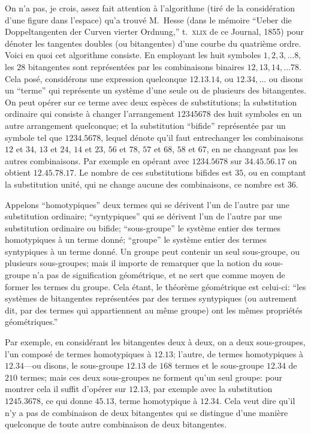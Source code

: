 \documentclass[11pt,a4paper]{article}
\begin{document}
On n'a pas, je crois, assez fait attention \`a l'algorithme (tir\'e de la consid\'eration
d'une figure dans l'espace) qu'a trouv\'e M.\ Hesse (dans le m\'emoire ``Ueber die
Doppeltangenten der Curven vierter Ordnung,'' t.\ \textsc{xlix} de ce Journal, 1855) pour
d\'enoter les tangentes doubles (ou bitangentes) d'une courbe du quatri\`eme ordre.
Voici en quoi cet algorithme consiste. En employant les huit symboles $1, 2, 3, \ldots 8$,
les $28$ bitangentes sont repr\'esent\'ees par les combinaisons binaires $12, 13, 14, \ldots 78$.
Cela pos\'e, consid\'erons une expression quelconque $12.13.14$, ou $12.34, \ldots$ ou
disons un ``terme'' qui repr\'esente un syst\`eme d'une seule ou de plusieurs des
bitangentes. On peut op\'erer sur ce terme avec deux esp\`eces de substitutions; la
substitution ordinaire qui consiste \`a changer l'arrangement $12345678$ des huit
symboles en un autre arrangement quelconque; et la substitution ``bifide''
repr\'esent\'ee par un symbole tel que $1234.5678$, lequel d\'enote qu'il faut
entrechanger les combinaisons $12$ et $34$, $13$ et $24$, $14$ et $23$, $56$ et $78$,
$57$ et $68$, $58$ et $67$, en ne changeant pas les autres combinaisons. Par exemple en
op\'erant avec $1234.5678$ sur $34.45.56.17$ on obtient $12.45.78.17$. Le nombre de
ces substitutions bifides est $35$, ou en comptant la substitution unit\'e, qui ne
change aucune des combinaisons, ce nombre est $36$.

Appelons ``homotypiques'' deux termes qui se d\'erivent l'un de l'autre par une
substitution ordinaire; ``syntypiques'' qui se d\'erivent l'un de l'autre par une
substitution ordinaire ou bifide; ``sous-groupe'' le syst\`eme entier des termes
homotypiques \`a un terme donn\'e; ``groupe'' le syst\`eme entier des termes syntypiques
\`a un terme donn\'e. Un groupe peut contenir un seul sous-groupe, ou plusieurs
sous-groupes; mais il importe de remarquer que la notion du sous-groupe n'a pas de
signification g\'eom\'etrique, et ne sert que comme moyen de former les termes du
groupe. Cela \'etant, le th\'eor\`eme g\'eom\'etrique est celui-ci: ``les syst\`emes
de bitangentes repr\'esent\'ees par des termes syntypiques (ou autrement dit, par des
termes qui appartiennent au m\^eme groupe) ont les m\^emes propri\'et\'es g\'eom\'etriques.''

Par exemple, en consid\'erant les bitangentes deux \`a deux, on a deux sous-groupes,
l'un compos\'e de termes homotypiques \`a $12.13$; l'autre, de termes homotypiques \`a
$12.34$---ou disons, le sous-groupe $12.13$ de $168$ termes et le sous-groupe $12.34$
de $210$ termes; mais ces deux sous-groupes ne forment qu'un seul groupe: pour montrer
cela il suffit d'op\'erer sur $12.13$, par exemple avec la substitution $1245.3678$, ce
qui donne $45.13$, terme homotypique \`a $12.34$. Cela veut dire qu'il n'y a pas de
combinaison de deux bitangentes qui se distingue d'une mani\`ere quelconque de toute
autre combinaison de deux bitangentes.
\end{document}
